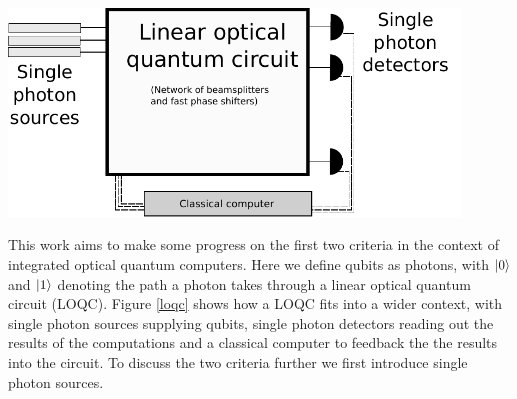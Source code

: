 \begingroup
    \centering  
    \includegraphics[width=12cm]{img/theory/loqc.pdf}
     \vspace{3pt} \label{loqc}
\endgroup

This work aims to make some progress on the first two criteria in the context of integrated optical quantum computers. Here we define qubits as photons, with $\ket{0}$ and $\ket{1}$ denoting the path a photon takes through a linear optical quantum circuit (LOQC). Figure \ref{loqc} shows how a LOQC fits into a wider context, with single photon sources supplying qubits, single photon detectors reading out the results of the computations and a classical computer to feedback the the results into the circuit. To discuss the two criteria further we first introduce single photon sources.




